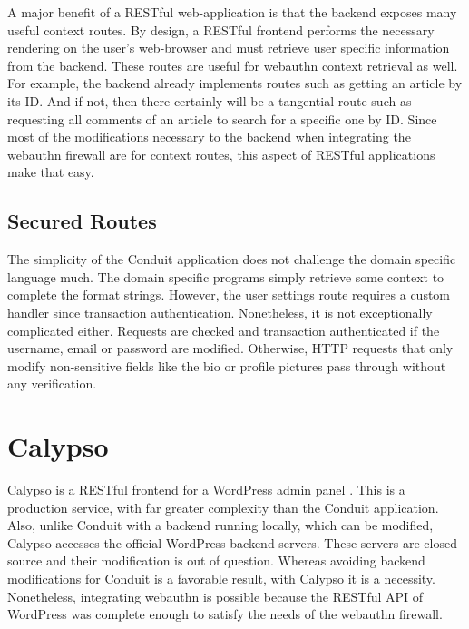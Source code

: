 A major benefit of a RESTful web-application is that the backend exposes many useful context routes. By design, a RESTful frontend performs the necessary rendering on the user's web-browser and must retrieve user specific information from the backend. These routes are useful for webauthn context retrieval as well. For example, the backend already implements routes such as getting an article by its ID. And if not, then there certainly will be a tangential route such as requesting all comments of an article to search for a specific one by ID. Since most of the modifications necessary to the backend when integrating the webauthn firewall are for context routes, this aspect of RESTful applications make that easy.

\subsection{Secured Routes}

The simplicity of the Conduit application does not challenge the domain specific language much. The domain specific programs simply retrieve some context to complete the format strings. However, the user settings route requires a custom handler since transaction authentication. Nonetheless, it is not exceptionally complicated either. Requests are checked and transaction authenticated if the username, email or password are modified. Otherwise, HTTP requests that only modify non-sensitive fields like the bio or profile pictures pass through without any verification.


\section{Calypso}

Calypso is a RESTful frontend for a WordPress admin panel \cite{TODO-calypso}. This is a production service, with far greater complexity than the Conduit application. Also, unlike Conduit with a backend running locally, which can be modified, Calypso accesses the official WordPress backend servers. These servers are closed-source and their modification is out of question. Whereas avoiding backend modifications for Conduit is a favorable result, with Calypso it is a necessity. Nonetheless, integrating webauthn is possible because the RESTful API of WordPress was complete enough to satisfy the needs of the webauthn firewall.

